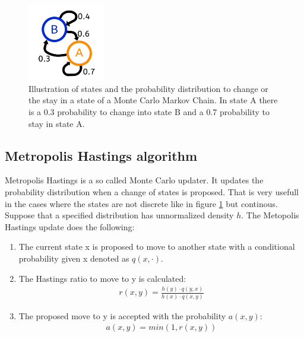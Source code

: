 \documentclass[english]{uzhpub}
\begin{document}
\begin{figure}[H]
  \centering
  \includegraphics[width=0.3\textwidth]{MCMC_Chain}
  \caption{Illustration of states and the probability distribution to change or the stay in a state of a Monte Carlo Markov Chain. In state A there is a 0.3 probability to change into state B and a 0.7 probability to stay in state A.}
  \label{fig:MCMC}
\end{figure}

\subsection{Metropolis Hastings algorithm}

Metropolis Hastings is a so called Monte Carlo updater. It updates the probability distribution when a change of states is proposed. That is very usefull in the cases where the states are not discrete like in figure \ref{fig:MCMC} but continous. Suppose that a specified distribution has unnormalized density $h$. The Metopolis Hastings update does the following:
\begin{enumerate}
  \item The current state x is proposed to move to another state with a conditional probability given x denoted as $q(x,\cdot)$.
  \item The Hastings ratio to move to y is calculated:
  \begin{align}
    r(x,y) = \frac{h(y) \cdot q(y,x)}{h(x) \cdot q(x,y)} \label{eq:r(x,y)}
  \end{align}
  \item The proposed move to y is accepted with the probability $a(x,y)$:
  \begin{align}
    a(x,y) = min(1,r(x,y))
  \end{align}
\end{enumerate}
\end{document}
